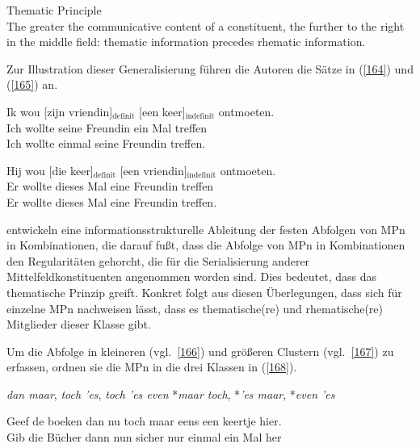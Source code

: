 \begin{exe}
	\ex\label{163} 
		Thematic Principle\\
		The greater the communicative content of a constituent, the further to the right in the middle field: thematic information precedes rhematic 				information.
\end{exe} 		
Zur Illustration dieser Generalisierung führen die Autoren die Sätze in (\ref{164}) und (\ref{165}) an.

\begin{exe}
    \ex\label{164}
        \gll Ik  wou [zijn vriendin]$_{\textrm{definit}}$ [een keer]$_{\textrm{indefinit}}$ ontmoeten.\\
        Ich wollte seine Freundin ein Mal treffen\\
        \glt Ich wollte einmal seine Freundin treffen.
\end{exe}

\begin{exe}
    \ex\label{165}
        \gll Hij wou [die keer]$_{\textrm{definit}}$ [een vriendin]$_{\textrm{indefinit}}$ ontmoeten.\\
        Er wollte dieses Mal eine Freundin treffen\\
        \glt Er wollte dieses Mal eine Freundin treffen.
\end{exe}
\citet{Vriendt1991} entwickeln eine informationsstrukturelle Ableitung der festen Abfolgen von MPn in Kombinationen, die darauf fußt, dass die Abfolge von MPn in Kombinationen den Regularitäten gehorcht, die für die Serialisierung anderer Mittelfeldkonstituenten angenommen worden sind. Dies bedeutet, dass das thematische Prinzip greift. Konkret folgt aus diesen Überlegungen, dass sich für einzelne MPn nachweisen lässt, dass es thematische(re) und rhematische(re) Mitglieder dieser Klasse gibt.

Um die Abfolge in kleineren (vgl.\ \ref{166}) und größeren Clustern (vgl.\ \ref{167}) zu erfassen, ordnen sie die MPn in die drei Klassen in (\ref{168}).

\begin{exe}
	\ex\label{166} 
		\begin{xlist}	
			\ex\label{166a} \textit{dan maar}, \textit{toch 'es}, \textit{toch 'es even}
			\ex\label{166b} *\textit{maar toch}, *\textit{'es maar}, *\textit{even 'es}
		\end{xlist}
\end{exe}

\begin{exe}
	\ex\label{167} 
	\gll Geef de boeken dan nu toch maar eens een keertje hier.\\
         Gib die Bücher dann nun sicher nur einmal ein Mal her\\
    \glt 
\hfill\hbox{\citet[47]{Vriendt1991}}
\end{exe}

